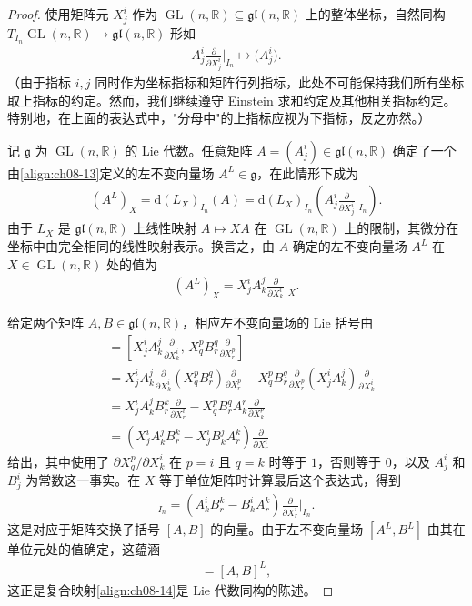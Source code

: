 \documentclass[../../main.tex]{subfiles}
\begin{document}
\begin{proof}
使用矩阵元 $X^i_j$ 作为 $\operatorname{GL}(n,\mathbb{R})\subseteq\mathfrak{gl}(n,\mathbb{R})$ 上的整体坐标，自然同构 $T_{I_n}\operatorname{GL}(n,\mathbb{R})\to\mathfrak{gl}(n,\mathbb{R})$ 形如
\begin{align*}
A^i_j\frac{\partial}{\partial X^i_j}\bigg|_{I_n}\mapsto\bigl(A^i_j\bigr).
\end{align*}
（由于指标 $i,j$ 同时作为坐标指标和矩阵行列指标，此处不可能保持我们所有坐标取上指标的约定。然而，我们继续遵守 Einstein 求和约定及其他相关指标约定。特别地，在上面的表达式中，"分母中"的上指标应视为下指标，反之亦然。）

记 $\mathfrak{g}$ 为 $\operatorname{GL}(n,\mathbb{R})$ 的 Lie 代数。任意矩阵 $A=(A^i_j)\in\mathfrak{gl}(n,\mathbb{R})$ 确定了一个由\eqref{align:ch08-13}定义的左不变向量场 $A^L\in\mathfrak{g}$，在此情形下成为
\begin{align*}
(A^L)_X=\mathrm{d}(L_X)_{I_n}(A)=\mathrm{d}(L_X)_{I_n}\left(A^i_j\frac{\partial}{\partial X^i_j}\bigg|_{I_n}\right).
\end{align*}
由于 $L_X$ 是 $\mathfrak{gl}(n,\mathbb{R})$ 上线性映射 $A\mapsto XA$ 在 $\operatorname{GL}(n,\mathbb{R})$ 上的限制，其微分在坐标中由完全相同的线性映射表示。换言之，由 $A$ 确定的左不变向量场 $A^L$ 在 $X\in\operatorname{GL}(n,\mathbb{R})$ 处的值为
\begin{align}
(A^L)_X=X^i_jA^j_k\frac{\partial}{\partial X^i_k}\bigg|_X.\label{align:ch08-15}
\end{align}

给定两个矩阵 $A,B\in\mathfrak{gl}(n,\mathbb{R})$，相应左不变向量场的 Lie 括号由
\begin{align*}
[A^L,B^L]&=\left[X^i_jA^j_k\frac{\partial}{\partial X^i_k},\,X^p_qB^q_r\frac{\partial}{\partial X^p_r}\right]\\
&=X^i_jA^j_k\frac{\partial}{\partial X^i_k}\left(X^p_qB^q_r\right)\frac{\partial}{\partial X^p_r}-X^p_qB^q_r\frac{\partial}{\partial X^p_r}\left(X^i_jA^j_k\right)\frac{\partial}{\partial X^i_k}\\
&=X^i_jA^j_kB^k_r\frac{\partial}{\partial X^i_r}-X^p_qB^q_rA^r_k\frac{\partial}{\partial X^p_k}\\
&=\left(X^i_jA^j_kB^k_r-X^i_jB^j_kA^k_r\right)\frac{\partial}{\partial X^i_r}
\end{align*}
给出，其中使用了 $\partial X^p_q/\partial X^i_k$ 在 $p=i$ 且 $q=k$ 时等于 $1$，否则等于 $0$，以及 $A^i_j$ 和 $B^i_j$ 为常数这一事实。在 $X$ 等于单位矩阵时计算最后这个表达式，得到
\begin{align*}
[A^L,B^L]_{I_n}=\left(A^i_kB^k_r-B^i_kA^k_r\right)\frac{\partial}{\partial X^i_r}\bigg|_{I_n}.
\end{align*}
这是对应于矩阵交换子括号 $[A,B]$ 的向量。由于左不变向量场 $[A^L,B^L]$ 由其在单位元处的值确定，这蕴涵
\begin{align*}
[A^L,B^L]=[A,B]^L,
\end{align*}
这正是复合映射\eqref{align:ch08-14}是 Lie 代数同构的陈述。
\end{proof}
\end{document}
